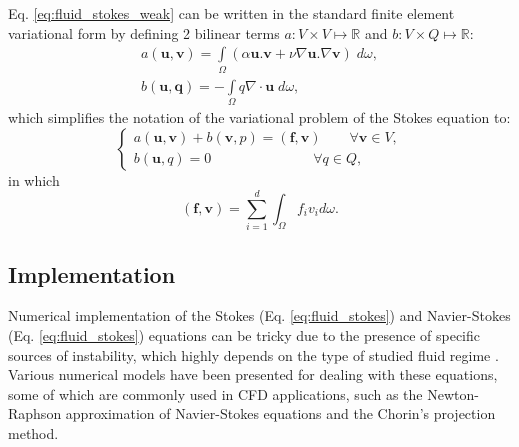 Eq. \ref{eq:fluid_stokes_weak} can be written in the standard finite element variational form by defining 2 bilinear terms $a: V \times V \mapsto \mathbb{R}$ and $b: V \times Q \mapsto \mathbb{R}$:
\begin{equation}
\begin{array}{*{20}{l}}
\displaystyle  {a({\mathbf{u}},{\mathbf{v}}) = \int\limits_\Omega  {(\alpha {\mathbf{u}}.{\mathbf{v}} + \nu\nabla {\mathbf{u}}.\nabla {\mathbf{v}})\;d\omega ,} } \\
\displaystyle  {b({\mathbf{u}},{\mathbf{q}}) =  - \int\limits_\Omega  {q\nabla\cdot{\mathbf{u}}\;d\omega ,} }
\end{array}
\end{equation}
which simplifies the notation of the variational problem of the Stokes equation to:
\begin{equation}
\left\{ {\begin{array}{*{20}{l}}
\displaystyle  {a({\mathbf{u}},{\mathbf{v}}) + {b}({\mathbf{v}},p) = ({\mathbf{f}},{\mathbf{v}})\qquad {\forall {\mathbf{v}}} \in V,} \\
\displaystyle  {b({\mathbf{u}},q) = 0\qquad \qquad \qquad \quad \;{\forall q} \in Q,}
\end{array}} \right.
\end{equation}
in which
\begin{equation}
(\mathbf{f}, \mathbf{v})=\sum_{i=1}^{d} \int_{\Omega} f_{i} v_{i} d \omega.
\end{equation}


\subsection{Implementation}

Numerical implementation of the Stokes (Eq. \ref{eq:fluid_stokes}) and Navier-Stokes (Eq. \ref{eq:fluid_stokes}) equations can be tricky due to the presence of specific sources of instability, which highly depends on the type of studied fluid regime \cite{Girault1979, Elman2014}. Various numerical models have been presented for dealing with these equations, some of which are commonly used in \gls{CFD} applications, such as the Newton-Raphson approximation of Navier-Stokes equations and the Chorin's projection method.

